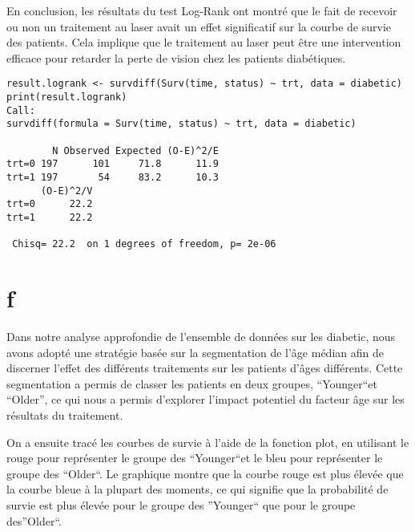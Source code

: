 \documentclass[../main.tex]{subfiles}
\begin{document}
\begin{CJK*}{UTF8}{gbsn}
En conclusion, les résultats du test Log-Rank ont montré que le fait de recevoir ou non un traitement au laser avait un effet significatif sur la courbe de survie des patients. Cela implique que le traitement au laser peut être une intervention efficace pour retarder la perte de vision chez les patients diabétiques.

\begin{lstlisting}
result.logrank <- survdiff(Surv(time, status) ~ trt, data = diabetic)
print(result.logrank)
Call:
survdiff(formula = Surv(time, status) ~ trt, data = diabetic)

        N Observed Expected (O-E)^2/E
trt=0 197      101     71.8      11.9
trt=1 197       54     83.2      10.3
      (O-E)^2/V
trt=0      22.2
trt=1      22.2

 Chisq= 22.2  on 1 degrees of freedom, p= 2e-06 
\end{lstlisting}

\section{f}
Dans notre analyse approfondie de l'ensemble de données sur les diabetic, nous avons adopté une stratégie basée sur la segmentation de l'âge médian afin de discerner l'effet des différents traitements sur les patients d'âges différents. Cette segmentation a permis de classer les patients en deux groupes, “Younger“et “Older”, ce qui nous a permis d'explorer l'impact potentiel du facteur âge sur les résultats du traitement.

On a ensuite tracé les courbes de survie à l'aide de la fonction plot, en utilisant le rouge pour représenter le groupe des “Younger“et le bleu pour représenter le groupe des “Older“. Le graphique montre que la courbe rouge est plus élevée que la courbe bleue à la plupart des moments, ce qui signifie que la probabilité de survie est plus élevée pour le groupe des ”Younger“ que pour le groupe des”Older“. 


\end{CJK*}
\end{document}
